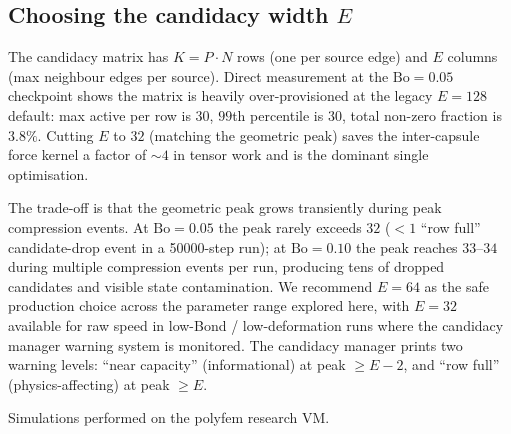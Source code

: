 \documentclass[aps,pre,twocolumn,floatfix,longbibliography]{revtex4-2}
\begin{document}
\subsection{Choosing the candidacy width $E$}
\label{sec:dt_E_choice}

The candidacy matrix has $K = P \cdot N$ rows (one per source edge) and
$E$ columns (max neighbour edges per source).  Direct measurement at
the $\mathrm{Bo} = 0.05$ checkpoint shows the matrix is heavily
over-provisioned at the legacy $E = 128$ default: max active per row
is $30$, $99$th percentile is $30$, total non-zero fraction is
$3.8\%$.  Cutting $E$ to $32$ (matching the geometric peak) saves the
inter-capsule force kernel a factor of $\sim 4$ in tensor work and is
the dominant single optimisation.

The trade-off is that the geometric peak grows transiently during
peak compression events.  At $\mathrm{Bo} = 0.05$ the peak rarely
exceeds $32$ ($< 1$ ``row full'' candidate-drop event in a 50000-step
run); at $\mathrm{Bo} = 0.10$ the peak reaches $33$--$34$ during
multiple compression events per run, producing tens of dropped
candidates and visible state contamination.  We recommend
$E = 64$ as the safe production choice across the parameter range
explored here, with $E = 32$ available for raw speed in low-Bond /
low-deformation runs where the candidacy manager warning system is
monitored.  The candidacy manager prints two warning levels: ``near
capacity'' (informational) at peak $\geq E - 2$, and ``row full''
(physics-affecting) at peak $\geq E$.

\acknowledgments
Simulations performed on the polyfem research VM.


\end{document}
